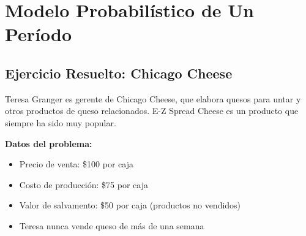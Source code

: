 \documentclass[12pt,a4paper]{book}
\begin{document}
	\section{Modelo Probabilístico de Un Período}
	
	\subsection{Ejercicio Resuelto: Chicago Cheese}
	
	\begin{tcolorbox}[enhanced,colback=verdeclaro,colframe=verdeprincipal,boxrule=2pt,arc=8pt,
		drop shadow,title={\bfseries\color{white} \faPuzzlePiece\ PROBLEMA}]
		
		Teresa Granger es gerente de Chicago Cheese, que elabora quesos para untar y otros productos de queso relacionados. E-Z Spread Cheese es un producto que siempre ha sido muy popular. 
		
		\textbf{Datos del problema:}
		\begin{itemize}[leftmargin=*,label=\textcolor{azulprincipal}{\faArrowRight}]
			\item Precio de venta: \$100 por caja
			\item Costo de producción: \$75 por caja
			\item Valor de salvamento: \$50 por caja (productos no vendidos)
			\item Teresa nunca vende queso de más de una semana
		\end{itemize}
		
	\end{tcolorbox}
	
\end{document}
